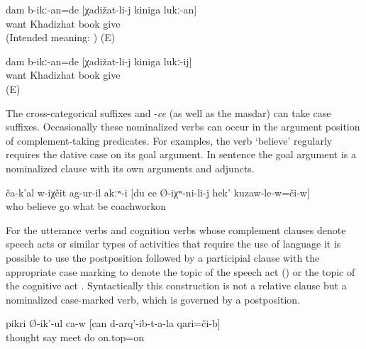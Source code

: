 %
\begin{exe}
		\ex	\label{ex:‎I wanted to give the book to Khadizhat1}
	\gll	* dam	b-ikː-an=de	[χadižat-li-j	kiniga	lukː-an]\\
		{} 	want	Khadizhat	book	give\\
	\glt	(Intended meaning: ) (E)
	
			\ex	\label{ex:‎I wanted to give the book to Khadizhat2}
	\gll	dam	b-ikː-an=de	[χadižat-li-j	kiniga	lukː-ij]\\
		 	want	Khadizhat	book	give\\
	\glt	{} (E)
\end{exe}

The cross-categorical suffixes  and -\textit{ce} (as well as the masdar) can take case suffixes. Occasionally these nominalized verbs can occur in the argument position of complement-taking predicates. For examples, the verb `believe' regularly requires the dative case on its goal argument. In sentence  the goal argument is a nominalized clause with its own arguments and adjuncts.

%
\begin{exe}
	\ex	\label{ex:‎Nobody believed what had happened to me, there up on the coachwork}
	\gll	ča-k'al	w-iχčit	ag-ur-il	akːʷ-i	[du	ce	Ø-iχʷ-ni-li-j	hek'	kuzaw-le-w=či-w]\\
		who	believe	go			what	be		coachworkon\\
	\glt	{}
\end{exe}

For the utterance verbs and cognition verbs whose complement clauses denote speech acts or similar types of activities that require the use of language it is possible to use the postposition  followed by a participial clause with the appropriate case marking to denote the topic of the speech act () or the topic of the cognitive act . Syntactically this construction is not a relative clause but a nominalized case-marked verb, which is governed by a postposition.  
%
\begin{exe}
	\ex	\label{ex:He thinks about what he had done}
	\gll	pikri	Ø-ik'-ul	ca-w	[can	d-arq'-ib-t-a-la	qari=či-b]\\
		thought	say		meet	do	on.top=on\\
	\glt	{}
\end{exe}


